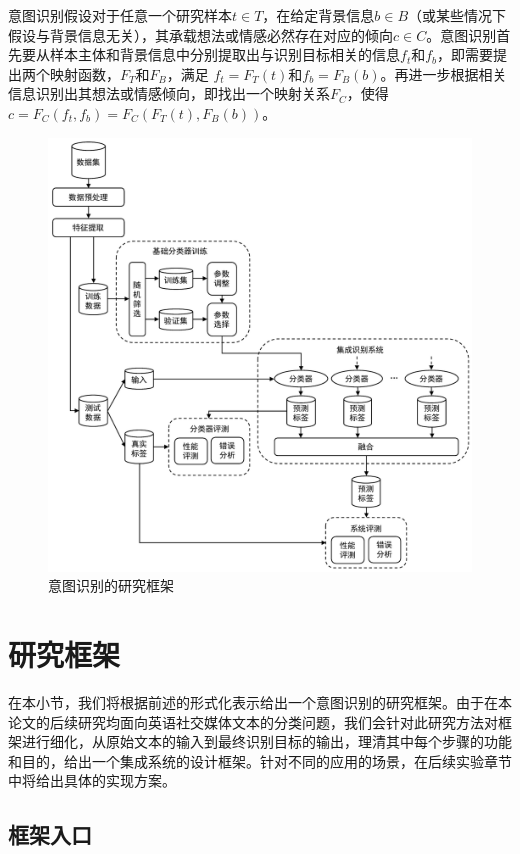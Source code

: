 意图识别假设对于任意一个研究样本$t \in T$，在给定背景信息$b \in B$（或某些情况下假设与背景信息无关），其承载想法或情感必然存在对应的倾向$c \in C$。意图识别首先要从样本主体和背景信息中分别提取出与识别目标相关的信息$f_t$和$f_b$，即需要提出两个映射函数，$F_T$和$F_B$，满足 $f_t=F_T(t)$和$f_b=F_B(b)$。再进一步根据相关信息识别出其想法或情感倾向，即找出一个映射关系$F_C$，使得 $c=F_C(f_t, f_b)=F_C(F_T(t), F_B(b))$。

\begin{figure}[H]
  \centering
  \includegraphics[width=\textwidth]{img/framework.pdf}
  \caption{意图识别的研究框架}
  \label{fig:framework}
\end{figure}

\section{研究框架}

在本小节，我们将根据前述的形式化表示给出一个意图识别的研究框架。由于在本论文的后续研究均面向英语社交媒体文本的分类问题，我们会针对此研究方法对框架进行细化，从原始文本的输入到最终识别目标的输出，理清其中每个步骤的功能和目的，给出一个集成系统的设计框架。针对不同的应用的场景，在后续实验章节中将给出具体的实现方案。

\subsection{框架入口}


